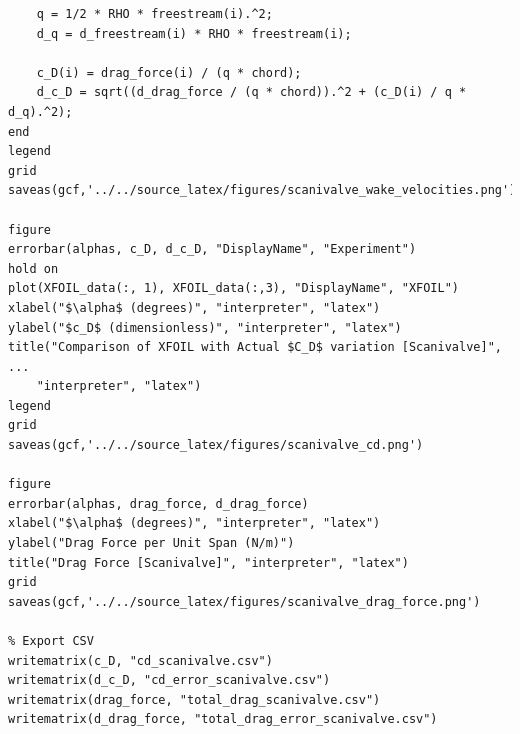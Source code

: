 \documentclass[runningheads]{llncs}
\begin{document}
\begin{verbatim}
    q = 1/2 * RHO * freestream(i).^2;
    d_q = d_freestream(i) * RHO * freestream(i);
    
    c_D(i) = drag_force(i) / (q * chord);
    d_c_D = sqrt((d_drag_force / (q * chord)).^2 + (c_D(i) / q * d_q).^2);
end
legend
grid
saveas(gcf,'../../source_latex/figures/scanivalve_wake_velocities.png')

figure
errorbar(alphas, c_D, d_c_D, "DisplayName", "Experiment")
hold on
plot(XFOIL_data(:, 1), XFOIL_data(:,3), "DisplayName", "XFOIL")
xlabel("$\alpha$ (degrees)", "interpreter", "latex")
ylabel("$c_D$ (dimensionless)", "interpreter", "latex")
title("Comparison of XFOIL with Actual $C_D$ variation [Scanivalve]", ...
    "interpreter", "latex")
legend
grid
saveas(gcf,'../../source_latex/figures/scanivalve_cd.png')

figure
errorbar(alphas, drag_force, d_drag_force)
xlabel("$\alpha$ (degrees)", "interpreter", "latex")
ylabel("Drag Force per Unit Span (N/m)")
title("Drag Force [Scanivalve]", "interpreter", "latex")
grid
saveas(gcf,'../../source_latex/figures/scanivalve_drag_force.png')

% Export CSV
writematrix(c_D, "cd_scanivalve.csv")
writematrix(d_c_D, "cd_error_scanivalve.csv")
writematrix(drag_force, "total_drag_scanivalve.csv")
writematrix(d_drag_force, "total_drag_error_scanivalve.csv")
\end{verbatim}
\end{document}
